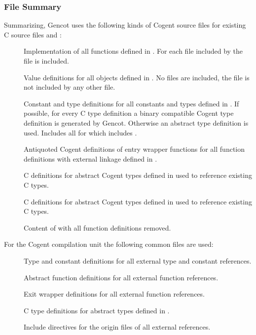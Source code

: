 \subsubsection{File Summary}

Summarizing, Gencot uses the following kinds of Cogent source files for existing C source files  and :
\begin{description}
\item[] Implementation of all functions defined in . For each file  included by
   the file  is included.
\item[] Value definitions for all objects defined in . No files are included, the file is not
  included by any other file.
\item[] Constant and type definitions for all constants and types defined in . 
  If possible, for every C type definition a binary compatible Cogent type 
  definition is generated by Gencot. Otherwise an abstract type definition is used. Includes
  all  for which  includes .
\item[] Antiquoted Cogent definitions of entry wrapper functions for all function definitions with external linkage
  defined in .
\item[] C definitions for abstract Cogent types defined in  used to reference existing C types.
\item[] C definitions for abstract Cogent types defined in  used to reference existing C types.
\item[] Content of  with all function definitions removed.
\end{description}

For the Cogent compilation unit the following common files are used:
\begin{description}
\item[] Type and constant definitions for all external type and constant references.
\item[] Abstract function definitions for all external function references.
\item[] Exit wrapper definitions for all external function references.
\item[] C type definitions for abstract types defined in .
\item[] Include directives for the origin files of all external references.
\end{description}

